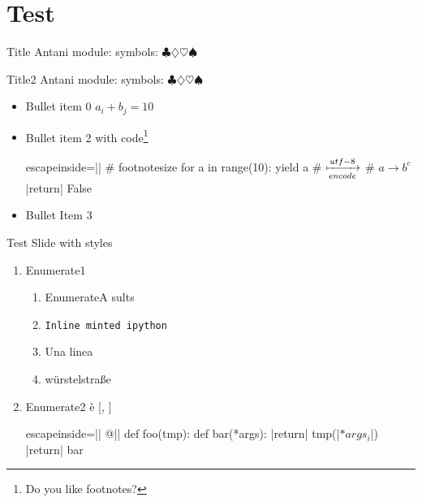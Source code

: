 \section{Test}

\begin{pyframe}{Title}{}
Antani
module: 
symbols: $\clubsuit \diamondsuit \heartsuit \spadesuit$
\end{pyframe}

\begin{pyframe}{Title2}
Antani
module: 
symbols: $\clubsuit \diamondsuit \heartsuit \spadesuit$
\end{pyframe}

\begin{pyframe}{}
\begin{itemize}
\item Bullet  item 0 $a_i + b_j = 10 $
\item Bullet  item 2 with code\footnote{Do you like footnotes?}
\begin{pycode*}{escapeinside=||}
    # footnotesize
    for  a in range(10):
        yield a
    # $\xmapsto[encode]{utf-8}$
    # $a \rightarrow b^{c}$
    |return| False
\end{pycode*}
\item Bullet Item 3 
\end{itemize}
\end{pyframe}

\begin{pyframe}{Test Slide with styles}
\begin{enumerate}
\item Enumerate1  
    \begin{enumerate}
    \item EnumerateA  sults
    \item \texttt{Inline minted ipython}
    \item Una linea 
    \item w\"urstelstra\ss e
    \end{enumerate}

\item Enumerate2 \`{e} 
 [, ] 
\begin{pycode*}{escapeinside=||}
@||
def foo(tmp):
    def bar(*args):
        |return| tmp(|$*args_{i}$|)
    |return| bar
\end{pycode*}

\end{enumerate}

\end{pyframe}

